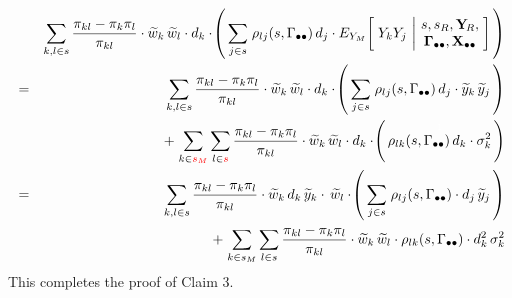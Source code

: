 \begin{enumerate}
    \begin{eqnarray*}
    &&
        \underset{k,l \in s}{\sum}\,
        \dfrac{\pi_{kl} - \pi_{k}\pi_{l}}{\pi_{kl}}
        \cdot
        \widetilde{w}_{k}\,\widetilde{w}_{l}
        \cdot
        d_{k}
        \cdot\!
        \left(\,
            \underset{j \in s}{\sum}\;
            \rho_{lj}(s,\gdotdot)\,d_{j}
            \cdot
            E_{Y_{M}}\!\left[\;
                Y_{k}Y_{j}
                \,\left\vert\!
                \begin{array}{c} s,s_{R},\YsubR, \\ \Gdotdot,\Xobs \end{array}
                \right.
                \!\!\right]
            \,\right)
    \\
    & = &
        \underset{k,l \in s}{\sum}\,
        \dfrac{\pi_{kl} - \pi_{k}\pi_{l}}{\pi_{kl}}
        \cdot
        \widetilde{w}_{k}\,\widetilde{w}_{l}
        \cdot
        d_{k}
        \cdot\!
        \left(\,
            \underset{j \in s}{\sum}\;
            \rho_{lj}(s,\gdotdot)\,d_{j}
            \cdot
            \widetilde{y}_{k}\,\widetilde{y}_{j}
            \,\right)
    \\
    &&
        \; + \;
        \underset{k \in {\color{red}s_{M}}}{\sum}\,
        \underset{l \in {\color{red}s}}{\sum}\,
        \dfrac{\pi_{kl} - \pi_{k}\pi_{l}}{\pi_{kl}}
        \cdot
        \widetilde{w}_{k}\,\widetilde{w}_{l}
        \cdot
        d_{k}
        \cdot\!
        \left(\,\overset{{\color{white}1}}{\rho_{lk}(s,\gdotdot)\,d_{k}\cdot\sigma_{k}^{2}}\,\right)
    \\
    & = &
        \underset{k,l \in s}{\sum}\,
        \dfrac{\pi_{kl} - \pi_{k}\pi_{l}}{\pi_{kl}}
        \cdot
        \widetilde{w}_{k}\,d_{k}\,\widetilde{y}_{k}
        \cdot
        \,\widetilde{w}_{l}
        \cdot\!
        \left(\,
            \underset{j \in s}{\sum}\;
            \rho_{lj}(s,\gdotdot)
            \cdot
            d_{j}\,\widetilde{y}_{j}
            \,\right)
    \\
    &&
        \; + \;
        \underset{k \in {\color{black}s_{M}}}{\sum}\,
        \underset{l \in {\color{black}s}}{\sum}\,
        \dfrac{\pi_{kl} - \pi_{k}\pi_{l}}{\pi_{kl}}
        \cdot
        \widetilde{w}_{k}\,\widetilde{w}_{l}
        \cdot
        \rho_{lk}(s,\gdotdot)
        \cdot
        d_{k}^{2}\,
        \sigma_{k}^{2}
    \end{eqnarray*}
    This completes the proof of Claim 3.


\end{enumerate}
